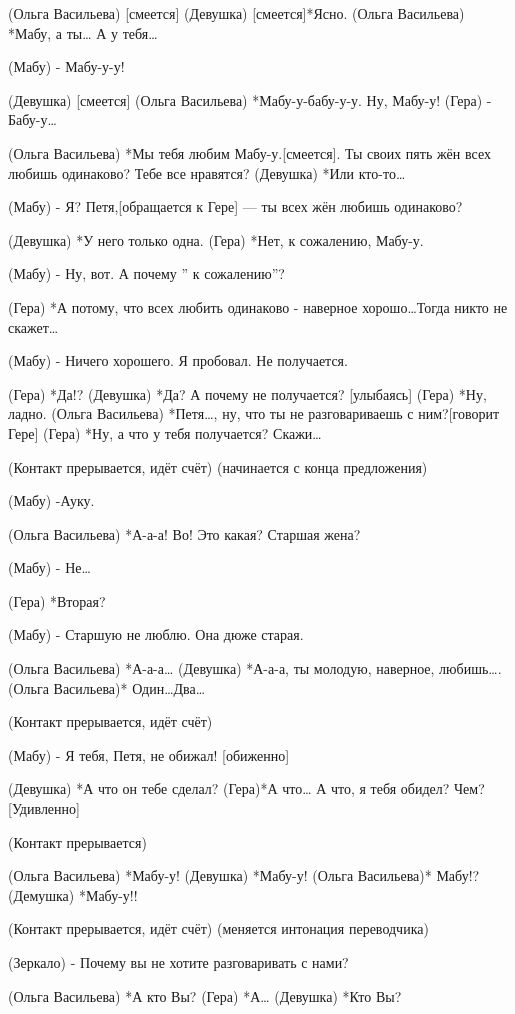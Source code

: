 (Ольга Васильева) [смеется] 
(Девушка) [смеется]*Ясно.
(Ольга Васильева) *Мабу, а ты… А у тебя…

(Мабу) -  Мабу-у-у!

(Девушка) [смеется] 
(Ольга Васильева) *Мабу-у-бабу-у-у. Ну, Мабу-у!
(Гера) - Бабу-у…

(Ольга Васильева) *Мы тебя любим Мабу-у.[смеется]. Ты своих пять жён всех любишь одинаково? Тебе все нравятся? 
(Девушка) *Или кто-то…

(Мабу) - Я? Петя,[обращается к Гере] — ты всех жён любишь одинаково?

(Девушка) *У него только одна.
(Гера) *Нет, к сожалению, Мабу-у. 

(Мабу)  - Ну, вот. А почему ” к сожалению”?

(Гера) *А потому, что всех любить одинаково - наверное хорошо…Тогда никто не скажет…

(Мабу) - Ничего хорошего. Я пробовал.  Не получается.

(Гера) *Да!?
(Девушка) *Да? А почему не получается? [улыбаясь]
(Гера) *Ну, ладно.
(Ольга Васильева) *Петя…, ну, что ты не разговариваешь с ним?[говорит Гере]
(Гера) *Ну, а что у тебя получается? Скажи…

(Контакт прерывается, идёт счёт)
(начинается с конца предложения)

(Мабу) -Ауку.

(Ольга Васильева) *А-а-а! Во! Это какая? Старшая жена?

(Мабу) - Не…

(Гера) *Вторая?

 (Мабу) - Старшую не люблю. Она  дюже старая.

(Ольга Васильева) *А-а-а…
(Девушка) *А-а-а, ты молодую, наверное, любишь….
(Ольга Васильева)* Один…Два…

(Контакт прерывается, идёт счёт)


 (Мабу) - Я тебя, Петя, не обижал! [обиженно]

(Девушка) *А что он тебе сделал?
(Гера)*А что… А что, я тебя обидел? Чем? [Удивленно]

(Контакт прерывается)

(Ольга Васильева) *Мабу-у!
(Девушка) *Мабу-у!
(Ольга Васильева)* Мабу!?
(Демушка) *Мабу-у!!

(Контакт прерывается, идёт счёт)
(меняется интонация переводчика)

(Зеркало) - Почему вы не хотите разговаривать с нами?

(Ольга Васильева) *А кто Вы?
(Гера) *А…
(Девушка) *Кто Вы?

